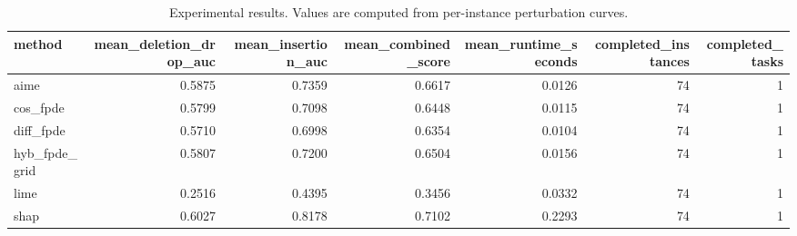 \begin{table}[t]
\caption{Experimental results. Values are computed from per-instance perturbation curves.}
\label{tab:main_results_computed}
\centering
\begin{tabular}{lrrrrrr}
\toprule
method & mean\_deletion\_drop\_auc & mean\_insertion\_auc & mean\_combined\_score & mean\_runtime\_seconds & completed\_instances & completed\_tasks \\
\midrule
aime & 0.5875 & 0.7359 & 0.6617 & 0.0126 & 74 & 1 \\
cos\_fpde & 0.5799 & 0.7098 & 0.6448 & 0.0115 & 74 & 1 \\
diff\_fpde & 0.5710 & 0.6998 & 0.6354 & 0.0104 & 74 & 1 \\
hyb\_fpde\_grid & 0.5807 & 0.7200 & 0.6504 & 0.0156 & 74 & 1 \\
lime & 0.2516 & 0.4395 & 0.3456 & 0.0332 & 74 & 1 \\
shap & 0.6027 & 0.8178 & 0.7102 & 0.2293 & 74 & 1 \\
\bottomrule
\end{tabular}

\end{table}
